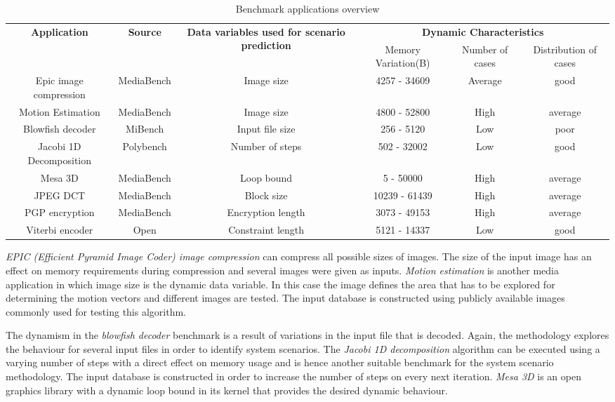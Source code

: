 \documentclass[a4paper,conference]{IEEEtran}
\begin{document}
\begin{center}
\begin{table}[!t]
\caption{Benchmark applications overview}
\label{tab:applications}
{\small
\hfill{}
\begin{tabular}{|c|c|c|c|c|c|}
\hline
\multirow{2}{*}{\textbf{Application}} & \multirow{2}{*}{\textbf{Source}} & \multirow{2}{*}{\parbox{3.2cm}{\textbf{Data variables used for scenario prediction}}} & \multicolumn{3}{c|}{\textbf{Dynamic Characteristics}} \\ \cline{4-6}
 & & & Memory Variation(B) & Number of cases & Distribution of cases\\ 
\hline 
Epic image compression & MediaBench & Image size & 4257 - 34609 & Average & good \\ 
\hline 
Motion Estimation & MediaBench 	& Image size & 4800 - 52800 & High & average \\ 
\hline 
Blowfish decoder & MiBench & Input file size & 256 - 5120 & Low  & poor \\ 
\hline 
Jacobi 1D Decomposition & Polybench & Number of steps & 502 - 32002 & Low  & good \\ 
\hline 
Mesa 3D & MediaBench & Loop bound & 5 - 50000 & High  & average\\ 
\hline 
JPEG DCT & MediaBench & Block size & 10239 - 61439 & High & average \\ 
\hline 
PGP encryption & MediaBench & Encryption length & 3073 - 49153 & High  & average \\ 
\hline 
Viterbi encoder & Open & Constraint length & 5121 - 14337 & Low & good \\ 
\hline 
\end{tabular}}
\end{table}
\end{center}

\textit{EPIC (Efficient Pyramid Image Coder) image compression} can compress all possible sizes of images. The size of the input image has an effect on memory requirements during compression and several images were given as inputs. \textit{Motion estimation} is another media application in which image size is the dynamic data variable. In this case the image defines the area that has to be explored for determining the motion vectors and different images are tested. The input database is constructed using publicly available images commonly used for testing this algorithm.

The dynamism in the \textit{blowfish decoder} benchmark is a result of variations in the input file that is decoded. Again, the methodology explores the behaviour for several input files in order to identify system scenarios. The \textit{Jacobi 1D decomposition} algorithm can be executed using a varying number of steps with a direct effect on memory usage and is hence another suitable benchmark for the system scenario methodology. The input database is constructed in order to increase the number of steps on every next iteration. \textit{Mesa 3D} is an open graphics library with a dynamic loop bound in its kernel that provides the desired dynamic behaviour. 
\end{document}
